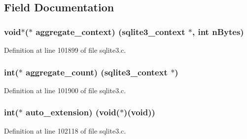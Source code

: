 \subsection{Field Documentation}
\hypertarget{structsqlite3__api__routines_ab685b51623f261c6ad88c4db73f6157c}{}
\subsubsection[{aggregate\+\_\+context}]{\setlength{\rightskip}{0pt plus 5cm}void$\ast$($\ast$ aggregate\+\_\+context) ({\bf sqlite3\+\_\+context} $\ast$, int n\+Bytes)}\label{structsqlite3__api__routines_ab685b51623f261c6ad88c4db73f6157c}


Definition at line 101899 of file sqlite3.\+c.

\hypertarget{structsqlite3__api__routines_ab3ac1965fdb669f6316ca7cec9f87877}{}
\subsubsection[{aggregate\+\_\+count}]{\setlength{\rightskip}{0pt plus 5cm}int($\ast$ aggregate\+\_\+count) ({\bf sqlite3\+\_\+context} $\ast$)}\label{structsqlite3__api__routines_ab3ac1965fdb669f6316ca7cec9f87877}


Definition at line 101900 of file sqlite3.\+c.

\hypertarget{structsqlite3__api__routines_aade9ee14eb586a61cb9d611c28fcaf70}{}
\subsubsection[{auto\+\_\+extension}]{\setlength{\rightskip}{0pt plus 5cm}int($\ast$ auto\+\_\+extension) (void($\ast$)(void))}\label{structsqlite3__api__routines_aade9ee14eb586a61cb9d611c28fcaf70}


Definition at line 102118 of file sqlite3.\+c.


